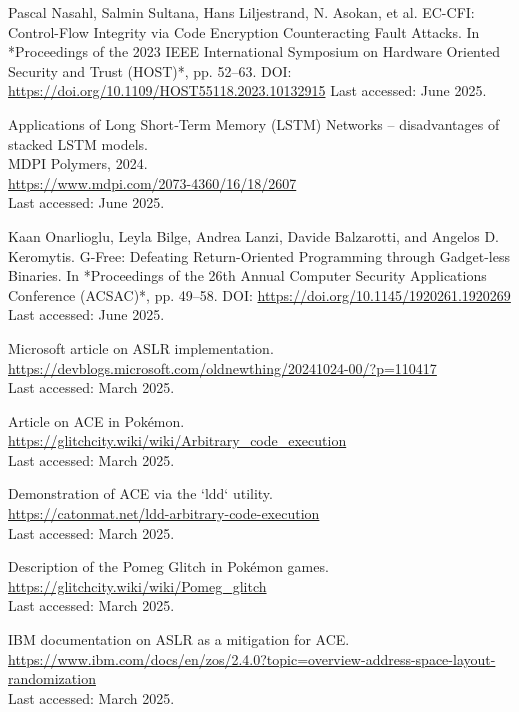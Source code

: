 \documentclass[a4paper]{usiinfbachelorproject}
\begin{document}
\begin{thebibliography}{99}
	Pascal Nasahl, Salmin Sultana, Hans Liljestrand, N. Asokan, et al.
	EC-CFI: Control-Flow Integrity via Code Encryption Counteracting Fault Attacks.
	In *Proceedings of the 2023 IEEE International Symposium on Hardware Oriented Security and Trust (HOST)*, pp. 52–63.
	DOI: \url{https://doi.org/10.1109/HOST55118.2023.10132915}
	Last accessed: June 2025.



	Applications of Long Short‑Term Memory (LSTM) Networks – disadvantages of stacked LSTM models.  \\
	MDPI Polymers, 2024.  \\
	\url{https://www.mdpi.com/2073-4360/16/18/2607}  \\
	Last accessed: June 2025.

	Kaan Onarlioglu, Leyla Bilge, Andrea Lanzi, Davide Balzarotti, and Angelos D. Keromytis.
	G-Free: Defeating Return-Oriented Programming through Gadget-less Binaries.
	In *Proceedings of the 26th Annual Computer Security Applications Conference (ACSAC)*, pp. 49–58.
	DOI: \url{https://doi.org/10.1145/1920261.1920269}
	Last accessed: June 2025.

	Microsoft article on ASLR implementation.\\
	\url{https://devblogs.microsoft.com/oldnewthing/20241024-00/?p=110417}\\
	Last accessed: March 2025.

	Article on ACE in Pokémon.\\
	\url{https://glitchcity.wiki/wiki/Arbitrary_code_execution}\\
	Last accessed: March 2025.


	Demonstration of ACE via the `ldd` utility.\\
	\url{https://catonmat.net/ldd-arbitrary-code-execution}\\
	Last accessed: March 2025.

	Description of the Pomeg Glitch in Pokémon games.\\
	\url{https://glitchcity.wiki/wiki/Pomeg_glitch}\\
	Last accessed: March 2025.

	IBM documentation on ASLR as a mitigation for ACE.\\
	\url{https://www.ibm.com/docs/en/zos/2.4.0?topic=overview-address-space-layout-randomization}\\
	Last accessed: March 2025.






\end{thebibliography}
\end{document}
